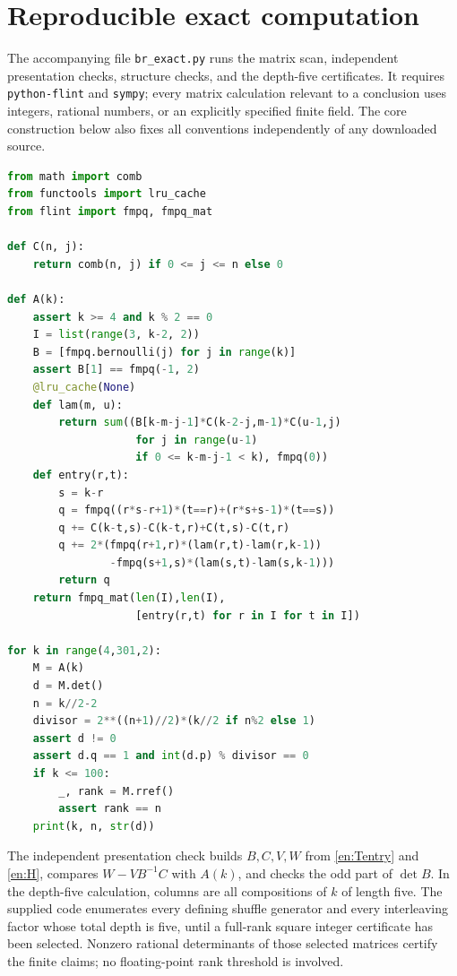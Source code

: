 \documentclass[12pt]{amsart}
\theoremstyle{definition}
\theoremstyle{remark}
\numberwithin{equation}{section}
\theoremstyle{definition}
\theoremstyle{remark}
\begin{document}
\appendix
\section{Reproducible exact computation}
The accompanying file \texttt{br\_exact.py} runs the matrix scan,
independent presentation checks, structure checks, and the depth-five
certificates. It requires \texttt{python-flint} and \texttt{sympy}; every
matrix calculation relevant to a conclusion uses integers, rational
numbers, or an explicitly specified finite field. The core construction
below also fixes all conventions independently of any downloaded source.
\begin{lstlisting}[language=Python]
from math import comb
from functools import lru_cache
from flint import fmpq, fmpq_mat

def C(n, j):
    return comb(n, j) if 0 <= j <= n else 0

def A(k):
    assert k >= 4 and k % 2 == 0
    I = list(range(3, k-2, 2))
    B = [fmpq.bernoulli(j) for j in range(k)]
    assert B[1] == fmpq(-1, 2)
    @lru_cache(None)
    def lam(m, u):
        return sum((B[k-m-j-1]*C(k-2-j,m-1)*C(u-1,j)
                    for j in range(u-1)
                    if 0 <= k-m-j-1 < k), fmpq(0))
    def entry(r,t):
        s = k-r
        q = fmpq((r*s-r+1)*(t==r)+(r*s+s-1)*(t==s))
        q += C(k-t,s)-C(k-t,r)+C(t,s)-C(t,r)
        q += 2*(fmpq(r+1,r)*(lam(r,t)-lam(r,k-1))
                -fmpq(s+1,s)*(lam(s,t)-lam(s,k-1)))
        return q
    return fmpq_mat(len(I),len(I),
                    [entry(r,t) for r in I for t in I])

for k in range(4,301,2):
    M = A(k)
    d = M.det()
    n = k//2-2
    divisor = 2**((n+1)//2)*(k//2 if n%2 else 1)
    assert d != 0
    assert d.q == 1 and int(d.p) % divisor == 0
    if k <= 100:
        _, rank = M.rref()
        assert rank == n
    print(k, n, str(d))
\end{lstlisting}
The independent presentation check builds $B,C,V,W$ from
\eqref{en:Tentry} and \eqref{en:H}, compares $W-VB^{-1}C$ with $A(k)$,
and checks the odd part of $\det B$. In the depth-five calculation,
columns are all compositions of $k$ of length five. The supplied code
enumerates every defining shuffle generator and every interleaving
factor whose total depth is five, until a full-rank square integer
certificate has been selected. Nonzero rational determinants of those
selected matrices certify the finite claims; no floating-point rank
threshold is involved.
\end{document}
